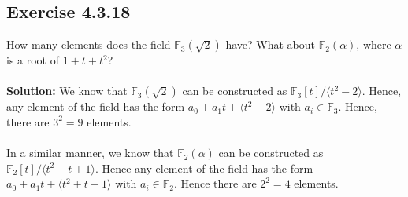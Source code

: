\documentclass{article}
\begin{document}
\subsection*{Exercise 4.3.18}
How many elements does the field $\mathbb{F}_3(\sqrt 2)$ have? What about $\mathbb{F}_2(\alpha)$, where $\alpha$ is a root of $1+t+t^2$?
\\\\
\textbf{Solution:}
We know that $\mathbb{F}_3(\sqrt 2)$ can be constructed as $\mathbb{F}_3[t]/\langle t^2 - 2 \rangle$. Hence, any element of the field has the form
$a_0 + a_1t + \langle t^2 - 2\rangle$ with $a_i \in \mathbb{F}_3$. Hence, there are $3^2 = 9$ elements.
\\\\
In a similar manner, we know that $\mathbb{F}_2(\alpha)$ can be constructed as $\mathbb{F}_2[t]/\langle t^2+t+1 \rangle$. Hence any element of the field has the form
$a_0 + a_1t + \langle t^2+t+1\rangle$ with $a_i \in \mathbb{F}_2$. Hence there are $2^2 = 4$ elements.
\end{document}
